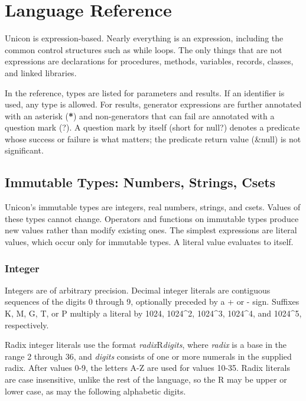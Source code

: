 \chapter{Language Reference}	%

Unicon is expression-based. Nearly everything is an expression,
including the common control structures such
as while loops. The only things that are not expressions are
declarations for procedures, methods, variables, records, classes, and
linked libraries.

In the reference, types are listed for parameters and results. If an
identifier is used, any type is allowed. For results,
generator expressions are further annotated with an
asterisk (\textsf{\textbf{*}}) and non-generators that can
fail are annotated with a question mark
(\textsf{?}). A question mark by itself (short for \textsf{null?})
denotes a predicate whose success or failure is what matters; the
predicate return value (\textsf{\&null}) is not significant.

\section{Immutable Types: Numbers, Strings, Csets}

Unicon's immutable types are integers, real numbers,
strings, and csets. Values of these types cannot change. Operators and
functions on immutable types produce new values rather than modify
existing ones. The simplest expressions are literal values, which occur
only for immutable types. A literal value evaluates to itself.

\subsection*{Integer}

Integers are of arbitrary precision. Decimal integer
literals are contiguous sequences of the digits 0 through 9, optionally
preceded by a + or - sign.  Suffixes K, M, G, T, or P multiply
a literal by 1024, 1024\^{}2, 1024\^{}3, 1024\^{}4, and
1024\^{}5, respectively.

Radix integer literals use the format
\textit{radix}R\textit{digits}, where \textit{radix} is a base in the
range 2 through 36, and \textit{digits} consists of one or more
numerals in the supplied radix. After values 0-9, the letters A-Z are
used for values 10-35. Radix literals are case insensitive, unlike the
rest of the language, so the R may be upper or lower case, as may the
following alphabetic digits.

